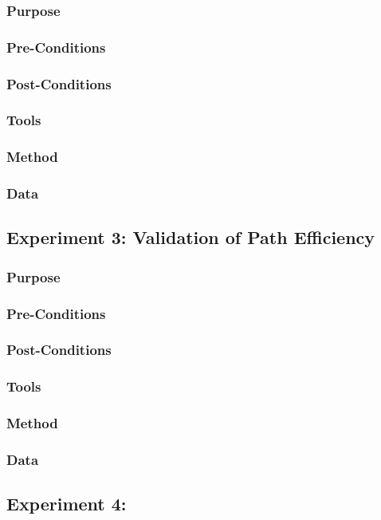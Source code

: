\documentclass[letterpaper,10pt]{article}
\begin{document}
\subsubsection{Purpose}
\subsubsection{Pre-Conditions}
\subsubsection{Post-Conditions}
\subsubsection{Tools}
\subsubsection{Method}
\subsubsection{Data}

\subsection{Experiment 3: Validation of Path Efficiency}
\subsubsection{Purpose}
\subsubsection{Pre-Conditions}
\subsubsection{Post-Conditions}
\subsubsection{Tools}
\subsubsection{Method}
\subsubsection{Data}

\subsection{Experiment 4: }
\end{document}
